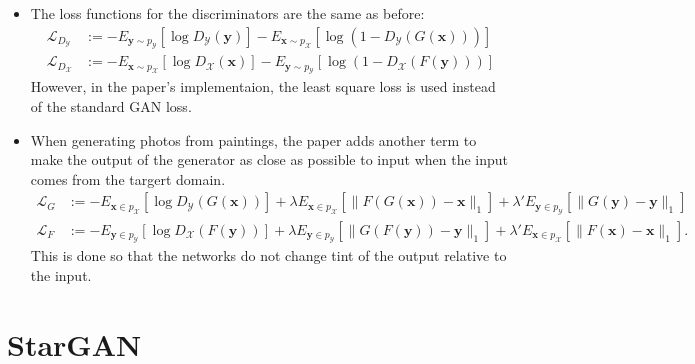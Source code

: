 \documentclass[10pt]{article}
\newcommand{\ve}[1]{\pmb{#1}}
\newcommand{\mc}[1]{\mathcal{#1}}
\begin{document}
\begin{itemize}
    \item The loss functions for the discriminators are the same as before:
    \begin{align*}
      \mathcal{L}_{D_{\mathcal{Y}}} 
      &:=
      -E_{\ve{y} \sim p_{\mathcal{Y}}}[ \log D_{\mc{Y}}(\ve{y})]
      -E_{\ve{x} \sim p_{\mc{X}}} [\log(1 - D_{\mc{Y}}(G(\ve{x})))]\\
      \mathcal{L}_{D_{\mathcal{X}}} 
      &:=
      -E_{\ve{x} \sim p_{\mathcal{X}}}[ \log D_{\mc{X}}(\ve{x})]
      -E_{\ve{y} \sim p_{\mc{Y}}} [\log(1 - D_{\mc{X}}(F(\ve{y})))]
    \end{align*}
    However, in the paper's implementaion, the least square loss is used instead of the standard GAN loss.

    \item When generating photos from paintings, the paper adds another term to make the output of the generator as close as possible to input when the input comes from the targert domain.
    \begin{align*}
      \mathcal{L}_{G} 
      &:= 
      - E_{\ve{x} \in p_{\mathcal{X}}} [\log D_{\mathcal{Y}}(G(\ve{x}))] 
      + \lambda E_{\ve{x} \in p_{\mathcal{X}}} [\| F(G(\ve{x})) - \ve{x} \|_1 ] 
      + \lambda' E_{\ve{y} \in p_{\mathcal{Y}}} [\| G(\ve{y}) - \ve{y} \|_1]
      \\
      \mathcal{L}_F
      &:= 
      - E_{\ve{y} \in p_{\mathcal{Y}}} [\log D_{\mathcal{X}}(F(\ve{y}))] 
      + \lambda E_{\ve{y} \in p_{\mathcal{Y}}} [\| G(F(\ve{y})) - \ve{y} \|_1 ]
      + \lambda' E_{\ve{x} \in p_{\mathcal{X}}} [\| F(\ve{x}) - \ve{x} \|_1 ].
    \end{align*}
    This is done so that the networks do not change tint of the output relative to the input.
  \end{itemize}

  \section{StarGAN}
\end{document}
